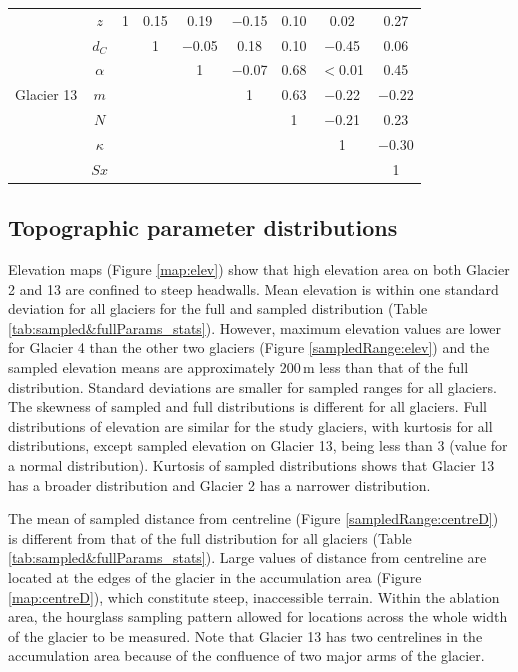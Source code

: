 \documentclass{sfuthesis}
\begin{document}
\begin{table}[H]
\begin{tabular}{cc|ccccccc}
\multirow{7}{*}{Glacier 13} & $z$ & 1 & 0.15 & 0.19 & $-$0.15 & 0.10 & 0.02 & 0.27 \\
 & $d_C$ &   & 1 & $-$0.05 & 0.18 & 0.10 & $-$0.45 & 0.06 \\
 & $\alpha$ &   &   & 1 & $-$0.07 & 0.68 & $<$0.01 & 0.45 \\
 & $m$ &   &   &   & 1 & 0.63 & $-$0.22 & $-$0.22 \\
 & $N$ &   &   &   &   & 1 & $-$0.21 & 0.23 \\
 & $\kappa$ &   &   &   &   &   & 1 & $-$0.30 \\
 & $Sx$ &   &   &   &   &   &   & 1
\end{tabular}
\end{table}


\subsection{Topographic parameter distributions}


Elevation maps (Figure \ref{map:elev}) show that high elevation area on both Glacier 2 and 13 are confined to steep headwalls. Mean elevation is within one standard deviation for all glaciers for the full and sampled distribution (Table \ref{tab:sampled&fullParams_stats}). However, maximum elevation values are lower for Glacier 4 than the other two glaciers (Figure \ref{sampledRange:elev}) and the sampled elevation means are approximately 200\,m less than that of the full distribution. Standard deviations are smaller for sampled ranges for all glaciers. The skewness of sampled and full distributions is different for all glaciers. Full distributions of elevation are similar for the study glaciers, with kurtosis for all distributions, except sampled elevation on Glacier 13, being less than 3 (value for a normal distribution). Kurtosis of sampled distributions shows that Glacier 13 has a broader distribution and Glacier 2 has a narrower distribution. 

The mean of sampled distance from centreline (Figure \ref{sampledRange:centreD}) is different from that of the full distribution for all glaciers (Table \ref{tab:sampled&fullParams_stats}). Large values of distance from centreline are located at the edges of the glacier in the accumulation area (Figure \ref{map:centreD}), which constitute steep, inaccessible terrain. Within the ablation area, the hourglass sampling pattern allowed for locations across the whole width of the glacier to be measured. Note that Glacier 13 has two centrelines in the accumulation area because of the confluence of two major arms of the glacier.
\end{document}
